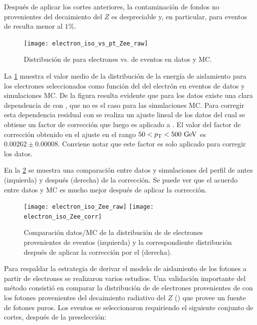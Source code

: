 Después de aplicar los cortes anteriores, la contaminación de fondos no
provenientes del decaimiento del $Z$ es despreciable y, en particular, para eventos
de {\ttbar} resulta menor al $1\%$.

\begin{figure}[!htbp]
  \centering
  \texttt{[image: electron\_iso\_vs\_pt\_Zee\_raw]}

  \caption{Distribución de {\etiso} para electrones vs. {\pt} de eventos {\Zee} en datos y MC.}
  \label{fig:isolation_vs_pt}
\end{figure}

La \cref{fig:isolation_vs_pt} muestra el valor medio de la distribución de la energía de
aislamiento para los electrones seleccionados como función del {\pt} del
electrón en eventos de datos y simulaciones MC. De la figura resulta evidente que
para los datos existe una clara dependencia de {\etiso} con {\pt}, que no es el caso
para las simulaciones MC.
Para corregir esta dependencia residual con {\pt} se realiza un ajuste lineal de los
datos del cual se obtiene un factor de corrección que luego es aplicado a {\etiso}.
El valor del factor de corrección
obtenido en el ajuste en el rango $50<\pt<500 \gev$ es $0.00262 \pm 0.00008$.
Conviene notar que este factor es solo aplicado para corregir los datos.

En la
\cref{fig:isolation_wandwo_correction} se muestra una comparación entre datos y
simulaciones del perfil de {\etiso} antes (izquierda) y después (derecha) de
la corrección. Se puede ver que el acuerdo entre datos y MC es mucho mejor después
de aplicar la corrección.


\begin{figure}[!htbp]
  \centering

  \texttt{[image: electron\_iso\_Zee\_raw]}
  \texttt{[image: electron\_iso\_Zee\_corr]}

  \caption{Comparación datos/MC de la distribución de {\etiso} de electrones
    provenientes de eventos {\Zee} (izquierda) y la correspondiente distribución
    después de aplicar la corrección por el {\pt} (derecha).}
  \label{fig:isolation_wandwo_correction}
\end{figure}

Para respaldar la estrategia de derivar el modelo de aislamiento de los fotones
a partir de electrones se realizaron varios estudios. Una validación importante del método
consistió en comparar la distribución de {\etiso} de electrones provenientes de
{\Zee} con los fotones provenientes del decaimiento radiativo del $Z$ (\Zee\gam) que provee un fuente
de fotones puros. Los eventos se seleccionaron requiriendo el siguiente conjunto
de cortes, después de la preselección:

